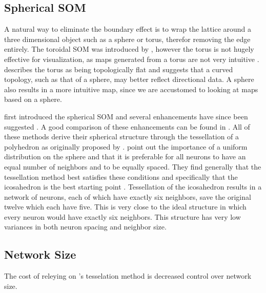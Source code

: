 \documentclass[11pt]{article}
\begin{document}
\subsection{Spherical SOM}
A natural way to eliminate the boundary effect is to wrap the lattice around a
three dimensional object such as a sphere or torus, therefor removing the edge
entirely. The toroidal SOM was introduced by \cite{li1993}, however the torus
is not hugely effective for visualization, as maps generated from a torus are
not very intuitive \citep{ito2000,wu2006}.  \cite{ritter99} describes the
torus as being topologically flat and suggests that a curved topology, such as
that of a sphere, may better reflect directional data.  A sphere also results
in a more intuitive map, since we are accustomed to looking at maps based on a
sphere.

\cite{ritter99} first introduced the spherical SOM and several enhancements have
since been suggested \citep{boudjemai2003,sangole03,Nishio:2006fk,wu2006}.  A
good comparison of these enhancements can be found in \citep{wu2006}.  All of
these methods derive their spherical structure through the tessellation of a
polyhedron as originally proposed by \citeauthor{ritter99}.  \cite{wu2006} point
out the importance of a uniform distribution on the sphere and that it is
preferable for all neurons to have an equal number of neighbors and to be
equally spaced.  They find generally that the tessellation method best satisfies
these conditions and specifically that the icosahedron is the best starting
point \citep{wu2005}. Tessellation of the icosahedron results in a network of
neurons, each of which have exactly six neighbors, save the original twelve which
each have five.  This is very close to the ideal structure in which every neuron
would have exactly six neighbors.  This structure has very low variances in both
neuron spacing and neighbor size.  

\subsection{Network Size}

The cost of releying on \citeauthor{ritter99}'s tesselation method is decreased
control over network size.
\end{document}
